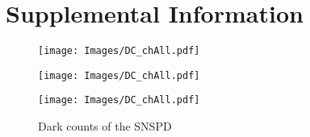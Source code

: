 \chapter{Supplemental Information}

\begin{figure}[h!]
	\noindent
	\begin{minipage}{0.33\textwidth}
		\texttt{[image: Images/DC\_chAll.pdf]}
	\end{minipage}%
	\begin{minipage}{0.33\textwidth}
		\texttt{[image: Images/DC\_chAll.pdf]}
	\end{minipage}%
	\begin{minipage}{0.33\textwidth}
		\texttt{[image: Images/DC\_chAll.pdf]}
	\end{minipage}
	\caption{Dark counts of the SNSPD}
	\label{fig:DC}
\end{figure}

